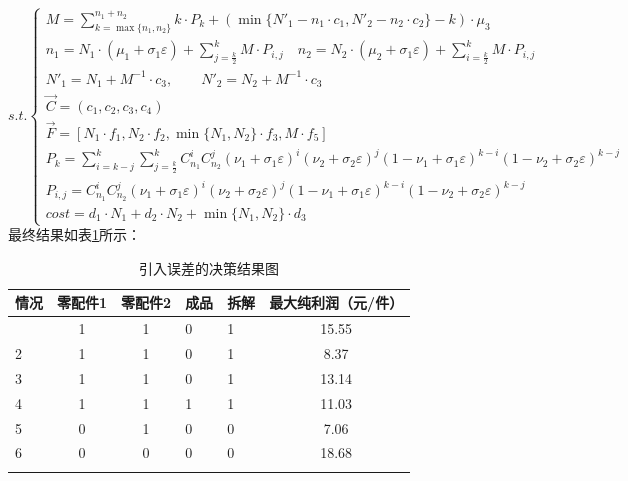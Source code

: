 \documentclass[withoutpreface,bwprint]{cumcmthesis} %
\begin{document}
\begin{equation*}
	s.t.\begin{cases}

		M=\sum_{k=\max \{n_{1},n_{2}\}}^{n_{1}+n_{2}}k\cdot P_{k} + (\min \{N'_{1}-n_{1}\cdot c_{1},N'_{2}-n_{2}\cdot c_{2}\}-k)\cdot \mu_{3}                              \\
		n_{1}=N_{1}\cdot (\mu_{1}+\sigma_{1}\varepsilon)+\sum_{j=\frac{k}{2}}^{k}M\cdot P_{i,j} \quad n_{2}=N_{2}\cdot (\mu_{2}+\sigma_{1}\varepsilon)+\sum_{i=\frac{k}{2}}^{k}M\cdot P_{i,j}                                                    \\
		N'_{1}=N_{1}+M^{-1}\cdot c_{3} ,\qquad N'_{2}=N_{2}+M^{-1}\cdot c_{3}                                                                                                                                             \\
		\vec{C}=(c_{1},c_{2},c_{3},c_{4})                                                                                                                                                 \\
		\vec{F}=[N_{1}\cdot f_{1},N_{2}\cdot f_{2},\min \{N_{1},N_{2}\}\cdot f_{3},M\cdot f_{5}]                                                                                         \\
		P_{k}=\sum_{i=k-j}^{k}\sum_{j=\frac{k}{2}}^{k}C_{n_{1}}^{i}C_{n_{2}}^{j}(\nu_{1}+\sigma_{1}\varepsilon)^{i}(\nu_{2}+\sigma_{2}\varepsilon)^{j}(1-\nu_{1}+\sigma_{1}\varepsilon)^{k-i}(1-\nu_{2}+\sigma_{2}\varepsilon)^{k-j}      \\
		P_{i,j}=C_{n_{1}}^{i}C_{n_{2}}^{j}(\nu_{1}+\sigma_{1}\varepsilon)^{i}(\nu_{2}+\sigma_{2}\varepsilon)^{j}(1-\nu_{1}+\sigma_{1}\varepsilon)^{k-i}(1-\nu_{2}+\sigma_{2}\varepsilon)^{k-j}                                       \\
		cost=d_{1}\cdot N_{1}+d_{2}\cdot N_{2}+\min \{ N_{1},N_{2}\}\cdot d_{3}
	\end{cases}
\end{equation*}
最终结果如表\ref{n_2}所示：
\begin{longtable}{m{1.5cm}<{\centering}ccm{1.5cm}<{\centering}m{1.5cm}<{\centering}c}
    \label{n_2}                             \\
    \hline
    情况 & 零配件1 & 零配件2 & 成品 & 拆解 & 最大纯利润（元/件） \\ \hline
    \endfirsthead
    \endhead
    \hline
    \endfoot
    \endlastfoot
    1  & 1    & 1    & 0  & 1  & 15.55      \\
    2  & 1    & 1    & 0  & 1  & 8.37       \\
    3  & 1    & 1    & 0  & 1  & 13.14      \\
    4  & 1    & 1    & 1  & 1  & 11.03      \\
    5  & 0    & 1    & 0  & 0  & 7.06       \\
    6  & 0    & 0    & 0  & 0  & 18.68      \\ \hline
    \caption{引入误差的决策结果图}
\end{longtable}
\end{document}
